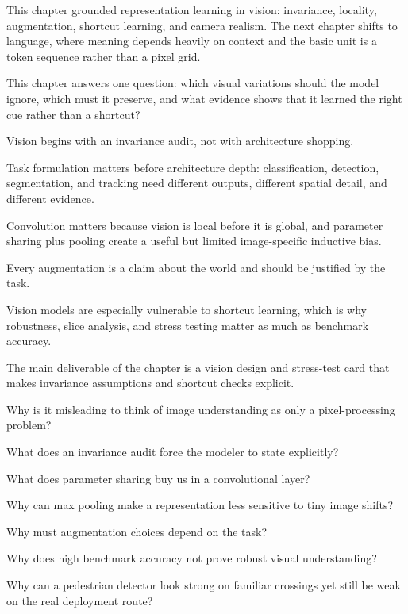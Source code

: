 This chapter grounded representation learning in vision: invariance, locality, augmentation, shortcut learning, and camera realism. The next chapter shifts to language, where meaning depends heavily on context and the basic unit is a token sequence rather than a pixel grid.

\begin{chaptersummary}
\item This chapter answers one question: which visual variations should the model ignore, which must it preserve, and what evidence shows that it learned the right cue rather than a shortcut?
\item Vision begins with an invariance audit, not with architecture shopping.
\item Task formulation matters before architecture depth: classification, detection, segmentation, and tracking need different outputs, different spatial detail, and different evidence.
\item Convolution matters because vision is local before it is global, and parameter sharing plus pooling create a useful but limited image-specific inductive bias.
\item Every augmentation is a claim about the world and should be justified by the task.
\item Vision models are especially vulnerable to shortcut learning, which is why robustness, slice analysis, and stress testing matter as much as benchmark accuracy.
\item The main deliverable of the chapter is a vision design and stress-test card that makes invariance assumptions and shortcut checks explicit.
\end{chaptersummary}

\begin{studyquestions}
\item Why is it misleading to think of image understanding as only a pixel-processing problem?
\item What does an invariance audit force the modeler to state explicitly?
\item What does parameter sharing buy us in a convolutional layer?
\item Why can max pooling make a representation less sensitive to tiny image shifts?
\item Why must augmentation choices depend on the task?
\item Why does high benchmark accuracy not prove robust visual understanding?
\item Why can a pedestrian detector look strong on familiar crossings yet still be weak on the real deployment route?
\end{studyquestions}

